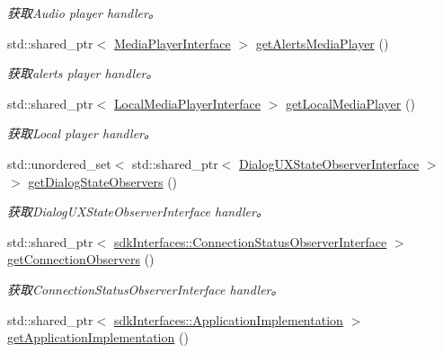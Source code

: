 \begin{DoxyCompactItemize}
\begin{DoxyCompactList}\small\item\em 获取\+Audio player handler。 \end{DoxyCompactList}\item 
std\+::shared\+\_\+ptr$<$ \hyperlink{classduerOSDcsSDK_1_1sdkInterfaces_1_1MediaPlayerInterface}{Media\+Player\+Interface} $>$ \hyperlink{structduerOSDcsSDK_1_1sdkInterfaces_1_1DcsSdkParameters_aedb56e9d51342ce49920decb10c4aae3}{get\+Alerts\+Media\+Player} ()
\begin{DoxyCompactList}\small\item\em 获取alerts player handler。 \end{DoxyCompactList}\item 
std\+::shared\+\_\+ptr$<$ \hyperlink{classduerOSDcsSDK_1_1sdkInterfaces_1_1LocalMediaPlayerInterface}{Local\+Media\+Player\+Interface} $>$ \hyperlink{structduerOSDcsSDK_1_1sdkInterfaces_1_1DcsSdkParameters_a20b4b22628b1708787e12f3623082f7b}{get\+Local\+Media\+Player} ()
\begin{DoxyCompactList}\small\item\em 获取\+Local player handler。 \end{DoxyCompactList}\item 
std\+::unordered\+\_\+set$<$ std\+::shared\+\_\+ptr$<$ \hyperlink{classduerOSDcsSDK_1_1sdkInterfaces_1_1DialogUXStateObserverInterface}{Dialog\+U\+X\+State\+Observer\+Interface} $>$ $>$ \hyperlink{structduerOSDcsSDK_1_1sdkInterfaces_1_1DcsSdkParameters_a77f1bc5116b53c12cb1d115e35ff7b14}{get\+Dialog\+State\+Observers} ()
\begin{DoxyCompactList}\small\item\em 获取\+Dialog\+U\+X\+State\+Observer\+Interface handler。 \end{DoxyCompactList}\item 
std\+::shared\+\_\+ptr$<$ \hyperlink{classduerOSDcsSDK_1_1sdkInterfaces_1_1ConnectionStatusObserverInterface}{sdk\+Interfaces\+::\+Connection\+Status\+Observer\+Interface} $>$ \hyperlink{structduerOSDcsSDK_1_1sdkInterfaces_1_1DcsSdkParameters_adfd39ff4af037a2844d1e977eb00b8c5}{get\+Connection\+Observers} ()
\begin{DoxyCompactList}\small\item\em 获取\+Connection\+Status\+Observer\+Interface handler。 \end{DoxyCompactList}\item 
std\+::shared\+\_\+ptr$<$ \hyperlink{classduerOSDcsSDK_1_1sdkInterfaces_1_1ApplicationImplementation}{sdk\+Interfaces\+::\+Application\+Implementation} $>$ \hyperlink{structduerOSDcsSDK_1_1sdkInterfaces_1_1DcsSdkParameters_ac6c35ff867585dbfce21418ee200bcb2}{get\+Application\+Implementation} ()

\end{DoxyCompactItemize}
